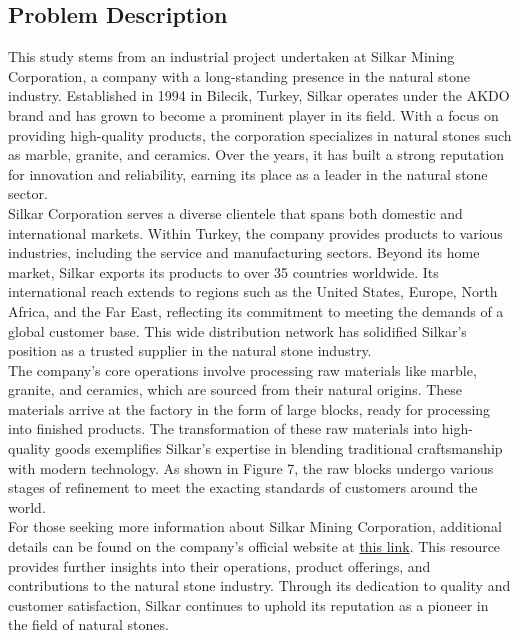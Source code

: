 \documentclass[a4paper]{article}
\begin{document}
    \subsection{Problem Description}
    This study stems from an industrial project undertaken at Silkar Mining Corporation, a company with a long-standing presence in the natural stone industry. Established in 1994 in Bilecik, Turkey, Silkar operates under the AKDO brand and has grown to become a prominent player in its field. With a focus on providing high-quality products, the corporation specializes in natural stones such as marble, granite, and ceramics. Over the years, it has built a strong reputation for innovation and reliability, earning its place as a leader in the natural stone sector.
    \vspace{0.2cm}\\
    Silkar Corporation serves a diverse clientele that spans both domestic and international markets. Within Turkey, the company provides products to various industries, including the service and manufacturing sectors. Beyond its home market, Silkar exports its products to over 35 countries worldwide. Its international reach extends to regions such as the United States, Europe, North Africa, and the Far East, reflecting its commitment to meeting the demands of a global customer base. This wide distribution network has solidified Silkar's position as a trusted supplier in the natural stone industry.
    \vspace{0.2cm}\\
    The company’s core operations involve processing raw materials like marble, granite, and ceramics, which are sourced from their natural origins. These materials arrive at the factory in the form of large blocks, ready for processing into finished products. The transformation of these raw materials into high-quality goods exemplifies Silkar’s expertise in blending traditional craftsmanship with modern technology. As shown in Figure 7, the raw blocks undergo various stages of refinement to meet the exacting standards of customers around the world.
    \vspace{0.2cm}\\
    For those seeking more information about Silkar Mining Corporation, additional details can be found on the company’s official website at \href{https://silkarstone.com/en/corporate}{this link}. This resource provides further insights into their operations, product offerings, and contributions to the natural stone industry. Through its dedication to quality and customer satisfaction, Silkar continues to uphold its reputation as a pioneer in the field of natural stones.
\end{document}
